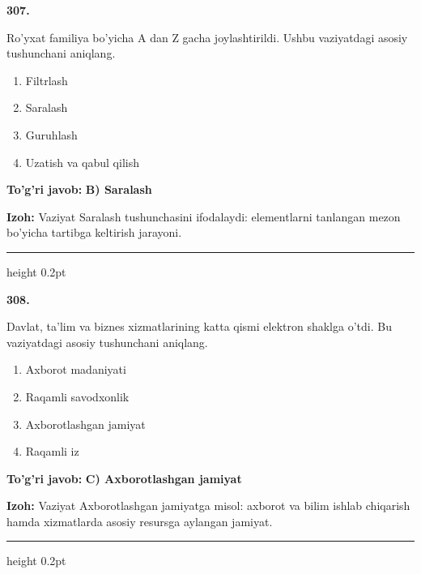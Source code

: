 \documentclass[10pt,a4paper,oneside]{article}
\begin{document}
\noindent\textbf{\color{ink}307.}
\par
Ro'yxat familiya bo'yicha A dan Z gacha joylashtirildi. Ushbu vaziyatdagi asosiy tushunchani aniqlang.
\begin{enumerate}[label=\Alph*),leftmargin=9mm]
\item Filtrlash
\item Saralash
\item Guruhlash
\item Uzatish va qabul qilish
\end{enumerate}
\begin{tcolorbox}[enhanced,breakable,colback=teal!4,colframe=teal!50!black,boxrule=0.5pt,arc=1.1mm,left=3mm,right=3mm,top=1.7mm,bottom=1.7mm,before skip=2mm,after skip=2mm]
\textbf{\color{teal}To'g'ri javob:} \textbf{B) Saralash}
\par\smallskip
\textbf{Izoh:} Vaziyat Saralash tushunchasini ifodalaydi: elementlarni tanlangan mezon bo'yicha tartibga keltirish jarayoni.
\end{tcolorbox}
\vspace{2mm}\hrule height 0.2pt \vspace{3mm}

\noindent\textbf{\color{ink}308.}
\par
Davlat, ta'lim va biznes xizmatlarining katta qismi elektron shaklga o'tdi. Bu vaziyatdagi asosiy tushunchani aniqlang.
\begin{enumerate}[label=\Alph*),leftmargin=9mm]
\item Axborot madaniyati
\item Raqamli savodxonlik
\item Axborotlashgan jamiyat
\item Raqamli iz
\end{enumerate}
\begin{tcolorbox}[enhanced,breakable,colback=teal!4,colframe=teal!50!black,boxrule=0.5pt,arc=1.1mm,left=3mm,right=3mm,top=1.7mm,bottom=1.7mm,before skip=2mm,after skip=2mm]
\textbf{\color{teal}To'g'ri javob:} \textbf{C) Axborotlashgan jamiyat}
\par\smallskip
\textbf{Izoh:} Vaziyat Axborotlashgan jamiyatga misol: axborot va bilim ishlab chiqarish hamda xizmatlarda asosiy resursga aylangan jamiyat.
\end{tcolorbox}
\vspace{2mm}\hrule height 0.2pt \vspace{3mm}
\end{document}

